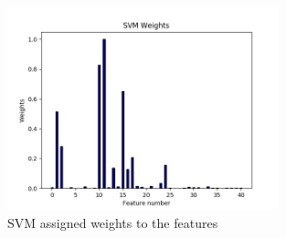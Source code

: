  \begin{figure}[htb]
 	\centering
 	\includegraphics[width=0.7\textwidth]{images/svm_weights.png}
 	\caption{SVM assigned weights to the features} 
 	\label{fig:result_svm_weights}
 \end{figure}

